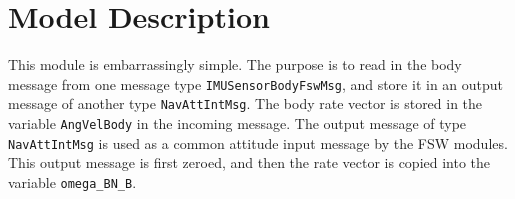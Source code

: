 
\section{Model Description}

This module is embarrassingly simple.  The purpose is to read in the body message from one message type {\tt IMUSensorBodyFswMsg}, and store it in an output message of another type {\tt NavAttIntMsg}.  The body rate vector is stored in the variable {\tt AngVelBody} in the incoming message.  The output message of type {\tt NavAttIntMsg} is used as a common attitude input message by the FSW modules.  This output message is first zeroed, and then the rate vector is copied into the variable {\tt omega\_BN\_B}. 
